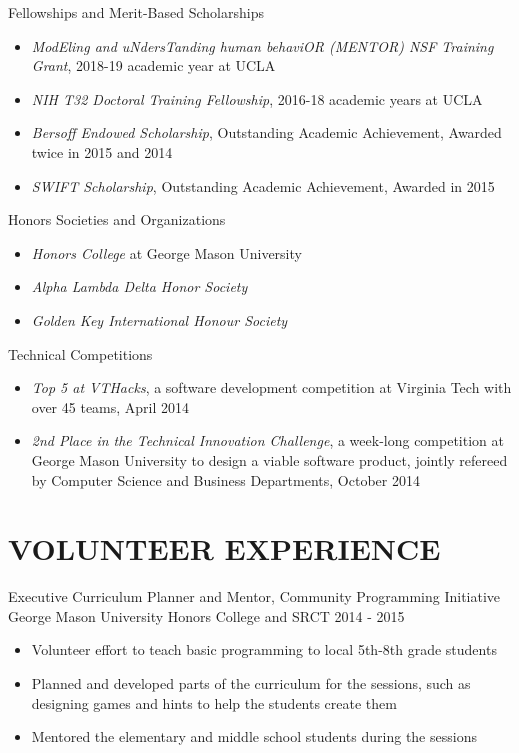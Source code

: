 \documentclass[margin, 10pt]{res} %
\begin{document}
\begin{resume}
Fellowships and Merit-Based Scholarships
\begin{itemize} \itemsep -2pt %
\item {\sl ModEling and uNdersTanding human behaviOR (MENTOR) NSF Training Grant}, 2018-19 academic year at UCLA
\item {\sl NIH T32 Doctoral Training Fellowship}, 2016-18 academic years at UCLA
\item {\sl Bersoff Endowed Scholarship}, Outstanding Academic Achievement, Awarded twice in 2015 and 2014
\item {\sl SWIFT Scholarship}, Outstanding Academic Achievement, Awarded in 2015
\end{itemize}

Honors Societies and Organizations
\begin{itemize} \itemsep -2pt %
\item {\sl Honors College} at George Mason University
\item {\sl Alpha Lambda Delta Honor Society}
\item {\sl Golden Key International Honour Society}
\end{itemize}

Technical Competitions
\begin{itemize} \itemsep -2pt %
\item {\sl Top 5 at VTHacks}, a software development competition at Virginia Tech with over 45 teams, April 2014
\item {\sl 2nd Place in the Technical Innovation Challenge}, a week-long competition at George Mason University to design a viable software product, jointly refereed by Computer Science and Business Departments, October 2014
\end{itemize}


\section{VOLUNTEER EXPERIENCE}

Executive Curriculum Planner and Mentor, Community Programming Initiative \\ George Mason University Honors College and SRCT
 \hfill 2014 - 2015
\begin{itemize} \itemsep -2pt %
\item Volunteer effort to teach basic programming to local 5th-8th grade students
\item Planned and developed parts of the curriculum for the sessions, such as designing games and hints to help the students create them
\item Mentored the elementary and middle school students during the sessions
\end{itemize} 


\end{resume}
\end{document}
